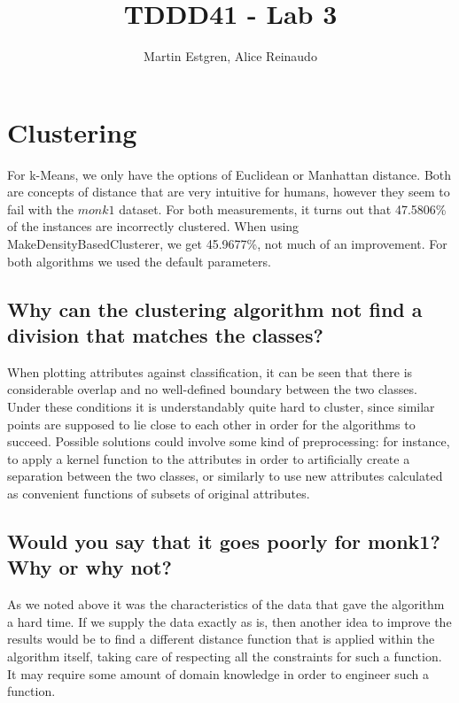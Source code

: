 \documentclass[]{article}
\title{TDDD41 - Lab 3}
\author{Martin Estgren, Alice Reinaudo}
\begin{document}
\maketitle



\section{Clustering}
For k-Means, we only have the options of Euclidean or Manhattan distance. Both are concepts of distance that are very intuitive for humans, however they seem to fail with the $monk1$ dataset. For both measurements, it turns out that 47.5806\% of the instances are incorrectly clustered. When using MakeDensityBasedClusterer, we get 45.9677\%, not much of an improvement. For both algorithms we used the default parameters.

\subsection{Why can the clustering algorithm not find a division that matches the classes?}
When plotting attributes against classification, it can be seen that there is considerable overlap and no well-defined boundary between the two classes. Under these conditions it is understandably quite hard to cluster, since similar points are supposed to lie close to each other in order for the algorithms to succeed. Possible solutions could involve some kind of preprocessing: for instance, to apply a kernel function to the attributes in order to artificially create a separation between the two classes, or similarly to use new attributes calculated as convenient functions of subsets of original attributes.

\subsection{Would you say that it goes poorly for monk1? Why or why not?}
As we noted above it was the characteristics of the data that gave the algorithm a hard time. If we supply the data exactly as is, then another idea to improve the results would be to find a different distance function that is applied within the algorithm itself, taking care of respecting all the constraints for such a function. It may require some amount of domain knowledge in order to engineer such a function.
\end{document}
